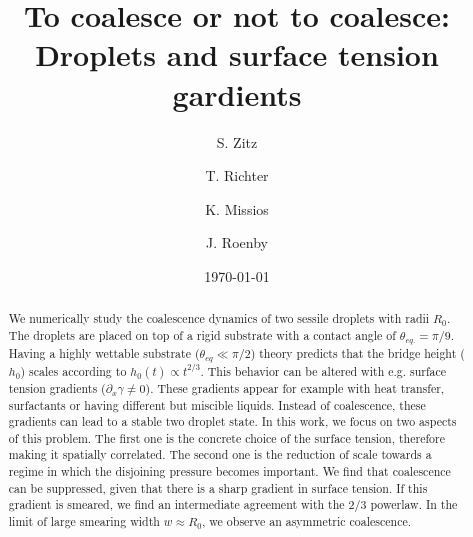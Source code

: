 \documentclass[twocolumn,amsmath,amssymb,showpacs,pre,nofootinbib,superscriptaddress]{revtex4-1} %
\begin{document}

\title{To coalesce or not to coalesce: Droplets and surface tension gardients}

\author{S. Zitz}
 \author{T. Richter}%
 \author{K. Missios}%
 \author{J. Roenby}%
\date{\today}

\begin{abstract}
We numerically study the coalescence dynamics of two sessile droplets with radii $R_0$.
The droplets are placed on top of a rigid substrate with a contact angle of $\theta_{eq.} = \pi/9$. 
Having a highly wettable substrate ($\theta_{eq} \ll \pi/2$) theory predicts that the bridge height ($h_0$) scales according to $h_0(t) \propto t^{2/3}.$
This behavior can be altered with e.g. surface tension gradients ($\partial_x\gamma \neq 0$). 
These gradients appear for example with heat transfer, surfactants or having different but miscible liquids.
Instead of coalescence, these gradients can lead to a stable two droplet state. 
In this work, we focus on two aspects of this problem.
The first one is the concrete choice of the surface tension, therefore making it spatially correlated.
The second one is the reduction of scale towards a regime in which the disjoining pressure becomes important. 
We find that coalescence can be suppressed, given that there is a sharp gradient in surface tension.
If this gradient is smeared, we find an intermediate agreement with the $2/3$ powerlaw.
In the limit of large smearing width $w \approx R_0$, we observe an asymmetric coalescence.
\end{abstract}
\end{document}

